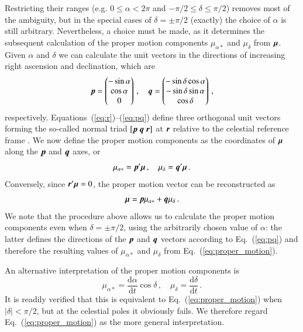 \documentclass{aa}
\def\vec#1{\ensuremath{\mathchoice{\mbox{\boldmath$\displaystyle#1$}}
{\mbox{\boldmath$\textstyle#1$}}
{\mbox{\boldmath$\scriptstyle#1$}}
{\mbox{\boldmath$\scriptscriptstyle#1$}}}}
\begin{document}
Restricting their ranges (e.g. $0\le\alpha<2\pi$ and
$-\pi/2\le\delta\le\pi/2$) removes most
of the ambiguity, but in the special cases of $\delta=\pm\pi/2$
(exactly) the choice of
$\alpha$ is still arbitrary. Nevertheless, a choice must be made, as it determines the
subsequent calculation of the proper motion components $\mu_{\alpha*}$ and $\mu_\delta$
from $\vec{\mu}$.
Given $\alpha$ and $\delta$ we can calculate the unit vectors in the directions of
increasing right ascension and declination, which are
\begin{equation}\label{eq:pq}
\vec{p}=
\begin{pmatrix}
-\sin\alpha \\
\cos\alpha \\
0
\end{pmatrix}\, ,\quad
\vec{q}=
\begin{pmatrix}
-\sin\delta\cos\alpha \\
-\sin\delta\sin\alpha \\
\cos\delta
\end{pmatrix}\,,
\end{equation}
respectively. Equations~(\ref{eq:r})--(\ref{eq:pq}) define three orthogonal unit vectors forming the so-called
normal triad $[\vec{p}~\vec{q}~\vec{r}]$ at $\vec{r}$ relative to the celestial reference frame
\citep{murray1983}. We now define the proper motion components as the coordinates of $\vec{\mu}$
along the $\vec{p}$ and $\vec{q}$ axes, or
\begin{equation}\label{eq:proper_motion}
\mu_{\alpha*}=\vec{p}'\vec{\mu}\, , \quad \mu_\delta=\vec{q}'\vec{\mu} \, .
\end{equation}
Conversely, since $\vec{r}'\vec{\mu}=0$, the proper motion vector can be reconstructed as
\begin{equation}\label{eq:mu_from_comp}
\vec{\mu} = \vec{p}\mu_{\alpha*} + \vec{q}\mu_\delta \, .
\end{equation}
We note that the procedure above allows us to calculate the proper motion components even when
$\delta=\pm\pi/2$, using the arbitrarily chosen value of $\alpha$: the latter defines the directions
of the $\vec{p}$ and $\vec{q}$ vectors according to Eq.~(\ref{eq:pq}) and therefore the resulting
values of $\mu_{\alpha*}$ and $\mu_\delta$ from Eq.~(\ref{eq:proper_motion}).

An alternative interpretation of the proper motion components is
\begin{equation}\label{eq:proper_motion_alt}
\mu_{\alpha*}=\frac{\mathrm{d}\alpha}{\mathrm{d}t}\cos\delta \, , \quad
\mu_\delta=\frac{\mathrm{d}\delta}{\mathrm{d}t} \, .
\end{equation}
It is readily verified that this is equivalent to
Eq.~(\ref{eq:proper_motion}) when
$\left|\delta\right|<\pi/2$, but at the celestial poles it obviously fails. We therefore
regard Eq.~(\ref{eq:proper_motion}) as the more general interpretation.
\end{document}
